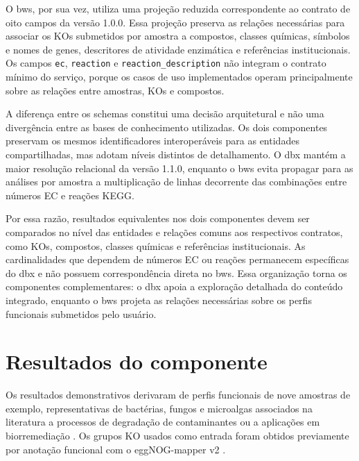 O \gls{bws}, por sua vez, utiliza uma projeção reduzida correspondente ao
contrato de oito campos da versão 1.0.0. Essa projeção preserva as relações
necessárias para associar os KOs submetidos por amostra a compostos, classes
químicas, símbolos e nomes de genes, descritores de atividade enzimática e
referências institucionais. Os campos \texttt{ec}, \texttt{reaction} e
\texttt{reaction\_description} não integram o contrato mínimo do serviço,
porque os casos de uso implementados operam principalmente sobre as relações
entre amostras, KOs e compostos.

A diferença entre os schemas constitui uma decisão arquitetural e não uma
divergência entre as bases de conhecimento utilizadas. Os dois componentes
preservam os mesmos identificadores interoperáveis para as entidades
compartilhadas, mas adotam níveis distintos de detalhamento. O \gls{dbx}
mantém a maior resolução relacional da versão 1.1.0, enquanto o \gls{bws}
evita propagar para as análises por amostra a multiplicação de linhas
decorrente das combinações entre números EC e reações KEGG.

Por essa razão, resultados equivalentes nos dois componentes devem ser
comparados no nível das entidades e relações comuns aos respectivos contratos,
como KOs, compostos, classes químicas e referências institucionais. As
cardinalidades que dependem de números EC ou reações permanecem específicas do
\gls{dbx} e não possuem correspondência direta no \gls{bws}. Essa organização
torna os componentes complementares: o \gls{dbx} apoia a exploração detalhada
do conteúdo integrado, enquanto o \gls{bws} projeta as relações necessárias
sobre os perfis funcionais submetidos pelo usuário.

\section{Resultados do componente}
\label{sec:c3-resultados}

Os resultados demonstrativos derivaram de perfis funcionais de nove
amostras de exemplo, representativas de bactérias, fungos e microalgas associados
na literatura a processos de degradação de contaminantes ou a aplicações em
biorremediação \cite{dellanno2021bioremediation}. Os grupos KO usados como
entrada foram obtidos previamente por anotação funcional com o eggNOG-mapper
v2 \cite{cantalapiedra2021eggnogmapper}.

